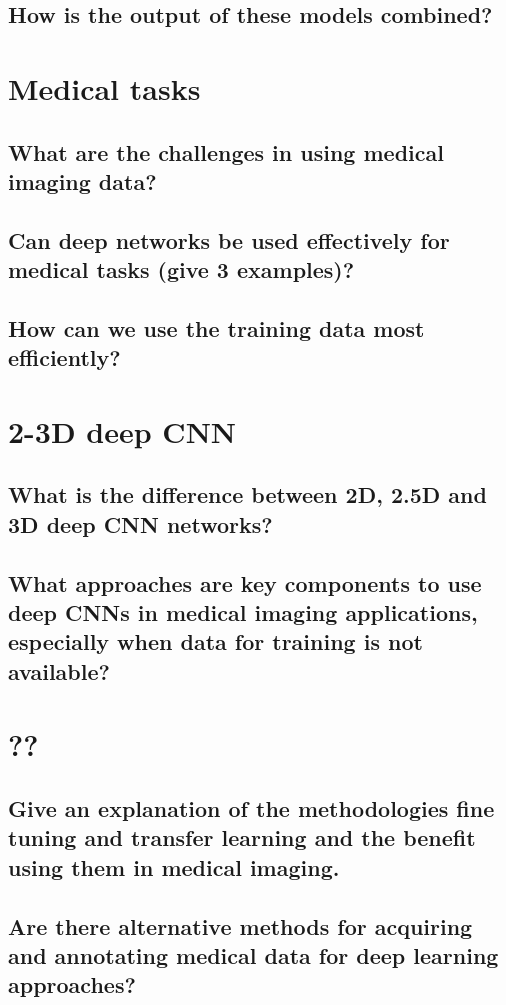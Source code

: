 \subsection{How is the output of these models combined?}

\section{Medical tasks}
\subsection{What are the challenges in using medical imaging data?}
\subsection{Can deep networks be used effectively for medical tasks (give 3 examples)?}
\subsection{How can we use the training data most efficiently?}

\section{2-3D deep CNN}
\subsection{What is the difference between 2D, 2.5D and 3D deep CNN networks?}
\subsection{What approaches are key components to use deep CNNs in medical imaging applications, especially when data for training is not available?}

\section{??}
\subsection{Give an explanation of the methodologies fine tuning and transfer learning and the benefit using them in medical imaging. }
\subsection{Are there alternative methods for acquiring and annotating medical data for deep learning approaches?}

